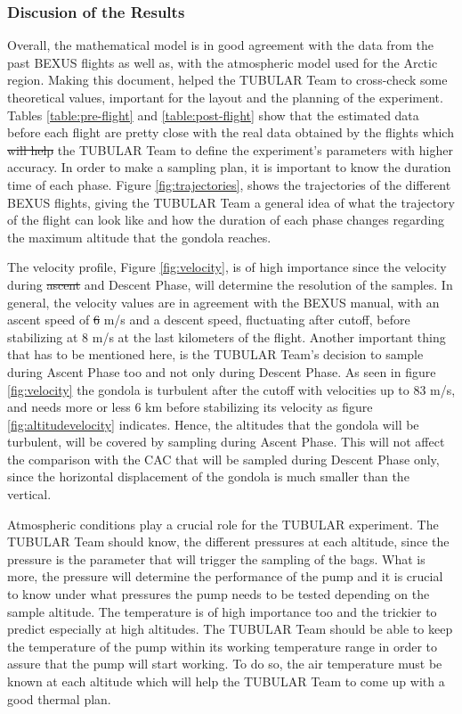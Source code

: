 \documentclass[a4paper,12pt,oneside]{article} %
\providecommand{\DIFaddtex}[1]{{\protect\color{blue}\uwave{#1}}} %
\providecommand{\DIFdeltex}[1]{{\protect\color{red}\sout{#1}}}                      %
\providecommand{\DIFaddbegin}{} %
\providecommand{\DIFaddend}{} %
\providecommand{\DIFdelbegin}{} %
\providecommand{\DIFdelend}{} %
\providecommand{\DIFadd}[1]{\texorpdfstring{\DIFaddtex{#1}}{#1}} %
\providecommand{\DIFdel}[1]{\texorpdfstring{\DIFdeltex{#1}}{}} %
\newcommand{\DIFscaledelfig}{0.5}
\newlength{\DIFdelgraphicswidth} %
\newlength{\DIFdelgraphicsheight} %
\newcommand{\DIFaddincludegraphics}[2][]{{\color{blue}\fbox{\DIFOincludegraphics[#1]{#2}}}} %
\newcommand{\DIFdelincludegraphics}[2][]{%
\sbox{\DIFdelgraphicsbox}{\DIFOincludegraphics[#1]{#2}}%
\settoboxwidth{\DIFdelgraphicswidth}{\DIFdelgraphicsbox} %
\settoboxtotalheight{\DIFdelgraphicsheight}{\DIFdelgraphicsbox} %
\scalebox{\DIFscaledelfig}{%
\parbox[b]{\DIFdelgraphicswidth}{\usebox{\DIFdelgraphicsbox}\\[-\baselineskip] \rule{\DIFdelgraphicswidth}{0em}}\llap{\resizebox{\DIFdelgraphicswidth}{\DIFdelgraphicsheight}{%
\setlength{\unitlength}{\DIFdelgraphicswidth}%
\begin{picture}(1,1)%
\thicklines\linethickness{2pt} %
{\color[rgb]{1,0,0}\put(0,0){\framebox(1,1){}}}%
{\color[rgb]{1,0,0}\put(0,0){\line( 1,1){1}}}%
{\color[rgb]{1,0,0}\put(0,1){\line(1,-1){1}}}%
\end{picture}%
}\hspace*{3pt}}} %
} %
\DeclareRobustCommand{\DIFaddbegin}{\DIFOaddbegin \let\includegraphics\DIFaddincludegraphics} %
\DeclareRobustCommand{\DIFaddend}{\DIFOaddend \let\includegraphics\DIFOincludegraphics} %
\DeclareRobustCommand{\DIFdelbegin}{\DIFOdelbegin \let\includegraphics\DIFdelincludegraphics} %
\DeclareRobustCommand{\DIFdelend}{\DIFOaddend \let\includegraphics\DIFOincludegraphics} %
\begin{document}
\begin{appendices}
\subsubsection{Discusion of the Results}
Overall, the mathematical model is in good agreement with the data from the past BEXUS flights as well as, with the atmospheric model used for the Arctic region.
Making this document, helped the TUBULAR Team to cross-check some theoretical values, important for the layout and the planning of the experiment. Tables \ref{table:pre-flight} and \ref{table:post-flight} show that the estimated data before each flight are pretty close with the real data obtained by the flights which \DIFdelbegin \DIFdel{will help }\DIFdelend \DIFaddbegin \DIFadd{helped }\DIFaddend the TUBULAR Team to define the experiment's parameters with higher accuracy. 
In order to make a sampling plan, it is important to know the duration time of each phase. Figure \ref{fig:trajectories}, shows the trajectories of the different BEXUS flights, giving the TUBULAR Team a general idea of what the trajectory of the flight can look like and how the duration of each phase changes regarding the maximum altitude that the gondola reaches.

The velocity profile, Figure \ref{fig:velocity}, is of high importance since the velocity during \DIFdelbegin \DIFdel{ascent }\DIFdelend \DIFaddbegin \DIFadd{Ascent }\DIFaddend and Descent Phase, will determine the resolution of the samples. In general, the velocity values are in agreement with the BEXUS manual, with an ascent speed of \DIFdelbegin \DIFdel{6 }\DIFdelend \DIFaddbegin \DIFadd{5 }\DIFaddend m/s and a descent speed, fluctuating after cutoff, before stabilizing at 8 m/s at the last kilometers of the flight. Another important thing that has to be mentioned here, is the TUBULAR Team's decision to sample during Ascent Phase too and not only during Descent Phase. As seen in figure \ref{fig:velocity} the gondola is turbulent after the cutoff with velocities up to 83 m/s, and needs more or less 6 km before stabilizing its velocity as figure \ref{fig:altitudevelocity} indicates. Hence, the altitudes that the gondola will be turbulent, will be covered by sampling during Ascent Phase. This will not affect the comparison with the CAC that will be sampled during Descent Phase only, since the horizontal displacement of the gondola is much smaller than the vertical. 

Atmospheric conditions play a crucial role for the TUBULAR experiment. The TUBULAR Team should know, the different pressures at each altitude, since the pressure is the parameter that will trigger the sampling of the bags. What is more, the pressure will determine the performance of the pump and it is crucial to know under what pressures the pump needs to be tested depending on the sample altitude. The temperature is of high importance too and the trickier to predict especially at high altitudes. The TUBULAR Team should be able to keep the temperature of the pump within its working temperature range in order to assure that the pump will start working. To do so, the air temperature must be known at each altitude which will help the TUBULAR Team to come up with a good thermal plan. 


\end{appendices}
\end{document}
